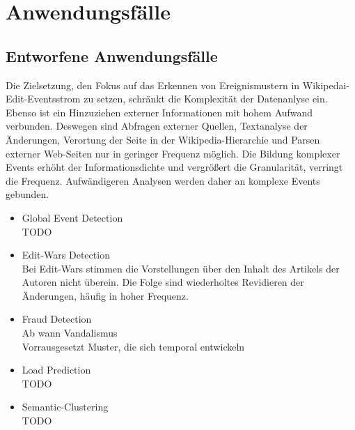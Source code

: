 \section{Anwendungsfälle}
\subsection{Entworfene Anwendungsfälle}
Die Zielsetzung, den Fokus auf das Erkennen von Ereignismustern in Wikipedai-Edit-Eventsstrom zu setzen, schränkt die Komplexität der Datenanlyse ein. Ebenso ist ein Hinzuziehen externer Informationen mit hohem Aufwand verbunden. Deswegen sind Abfragen externer Quellen, Textanalyse der Änderungen, Verortung der Seite in der Wikipedia-Hierarchie und Parsen externer Web-Seiten nur in geringer Frequenz möglich. Die Bildung komplexer Events erhöht der Informationsdichte und vergrößert die Granularität, verringt die Frequenz. Aufwändigeren Analysen werden daher an komplexe Events gebunden.

\begin{itemize}
    \item Global Event Detection\\ TODO
    \item Edit-Wars Detection\\ Bei Edit-Wars stimmen die Vorstellungen über den Inhalt des Artikels der Autoren nicht überein. Die Folge sind wiederholtes Revidieren der Änderungen, häufig in hoher Frequenz.
    \item Fraud Detection\\Ab wann Vandalismus \\Vorrausgesetzt Muster, die sich temporal entwickeln
    \item Load Prediction\\ TODO
    \item Semantic-Clustering\\ TODO
\end{itemize}
